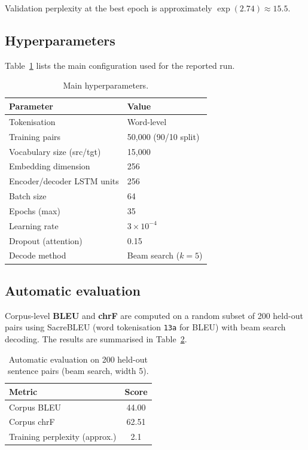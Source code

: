 \documentclass[12pt]{article}
\begin{document}
Validation perplexity at the best epoch is approximately $\exp(2.74) \approx 15.5$.

\subsection{Hyperparameters}
Table~\ref{tab:hparams} lists the main configuration used for the reported run.

\begin{table}[H]
  \centering
  \caption{Main hyperparameters.}
  \label{tab:hparams}
  \begin{tabular}{@{}ll@{}}
    \toprule
    \textbf{Parameter} & \textbf{Value} \\
    \midrule
    Tokenisation & Word-level \\
    Training pairs & 50{,}000 (90/10 split) \\
    Vocabulary size (src/tgt) & 15{,}000 \\
    Embedding dimension & 256 \\
    Encoder/decoder LSTM units & 256 \\
    Batch size & 64 \\
    Epochs (max) & 35 \\
    Learning rate & $3 \times 10^{-4}$ \\
    Dropout (attention) & 0.15 \\
    Decode method & Beam search ($k{=}5$) \\
    \bottomrule
  \end{tabular}
\end{table}

\subsection{Automatic evaluation}
Corpus-level \textbf{BLEU} and \textbf{chrF} are computed on a random subset of 200 held-out pairs using SacreBLEU (word tokenisation \texttt{13a} for BLEU) with beam search decoding. The results are summarised in Table~\ref{tab:metrics}.

\begin{table}[H]
  \centering
  \caption{Automatic evaluation on 200 held-out sentence pairs (beam search, width 5).}
  \label{tab:metrics}
  \begin{tabular}{@{}lc@{}}
    \toprule
    \textbf{Metric} & \textbf{Score} \\
    \midrule
    Corpus BLEU & 44.00 \\
    Corpus chrF & 62.51 \\
    Training perplexity (approx.) & 2.1 \\
    \bottomrule
  \end{tabular}
\end{table}
\end{document}
